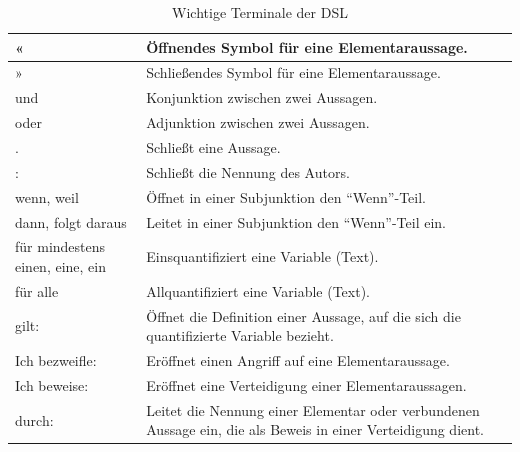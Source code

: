 \documentclass[11pt,a4paper,bibtotocnumbered]{scrreprt}
\begin{document}
\begin{table}[htbp]
\centering
\caption{Wichtige Terminale der DSL}
\label{terminale}
\begin{tabularx}{\textwidth}{|p{3cm}|X|}
\hline
« 				& Öffnendes Symbol für eine Elementaraussage.  \\ \hline
» 				& Schließendes Symbol für eine Elementaraussage.  \\ \hline
und  			& Konjunktion zwischen zwei Aussagen.   \\  \hline
oder  		& Adjunktion zwischen zwei Aussagen.   \\  \hline
.     			& Schließt eine Aussage.   \\  \hline
:				& Schließt die Nennung des Autors.   \\  \hline
wenn, weil	& Öffnet in einer Subjunktion den \enquote{Wenn}-Teil.   \\  \hline
dann, folgt daraus	& Leitet in einer Subjunktion den \enquote{Wenn}-Teil ein.   \\  \hline
für mindestens einen, eine, ein & Einsquantifiziert eine Variable (Text).   \\  \hline
für alle & Allquantifiziert eine Variable (Text).   \\  \hline
gilt:				& Öffnet die Definition einer Aussage, auf die sich die quantifizierte Variable bezieht.   \\  \hline
Ich bezweifle:		& Eröffnet einen Angriff auf eine Elementaraussage.   \\  \hline
Ich beweise:		& Eröffnet eine Verteidigung einer Elementaraussagen.   \\  \hline
durch:		& Leitet die Nennung einer Elementar oder verbundenen Aussage ein, die als Beweis in einer Verteidigung dient.   \\  \hline
\end{tabularx}
\end{table}
\end{document}
